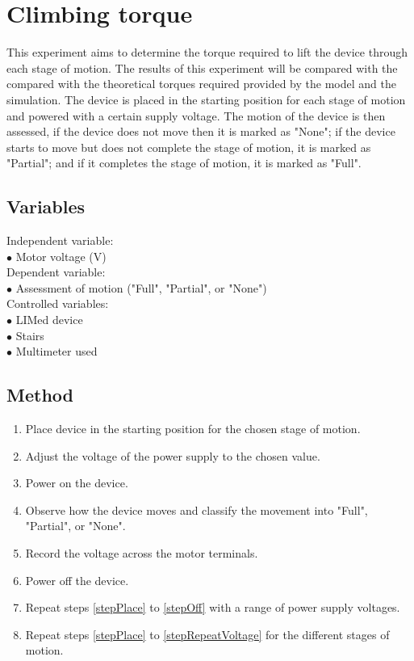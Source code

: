 \section{Climbing torque}
This experiment aims to determine the torque required to lift the device through each stage of motion. The results of this experiment will be compared with the compared with the theoretical torques required provided by the model and the simulation. The device is placed in the starting position for each stage of motion and powered with a certain supply voltage. The motion of the device is then assessed, if the device does not move then it is marked as "None"; if the device starts to move but does not complete the stage of motion, it is marked as "Partial"; and if it completes the stage of motion, it is marked as "Full".\\


\subsection{Variables}
Independent variable:\\
$\bullet$ Motor voltage (V)\\
Dependent variable:\\
$\bullet$ Assessment of motion ("Full", "Partial", or "None")\\
Controlled variables:\\
$\bullet$ LIMed device\\
$\bullet$ Stairs\\
$\bullet$ Multimeter used\\


\subsection{Method}

\begin{enumerate}
	\item Place device in the starting position for the chosen stage of motion. \label{stepPlace}
	\item Adjust the voltage of the power supply to the chosen value.
	\item Power on the device.
	\item Observe how the device moves and classify the movement into "Full", "Partial", or "None". 
	\item Record the voltage across the motor terminals. 
	\item Power off the device.\label{stepOff}
	\item Repeat steps \ref{stepPlace} to \ref{stepOff} with a range of power supply voltages.\label{stepRepeatVoltage}
	\item Repeat steps \ref{stepPlace} to \ref{stepRepeatVoltage} for the different stages of motion.
\end{enumerate}

